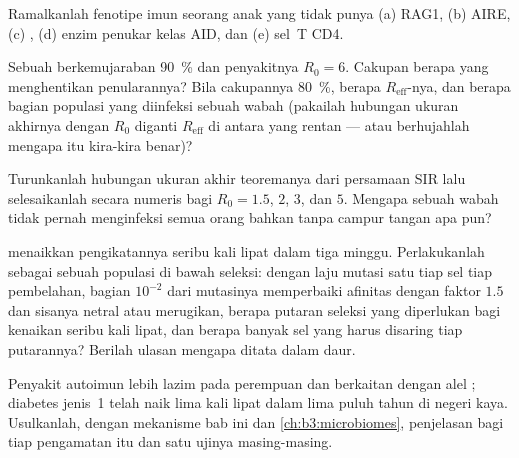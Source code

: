 \begin{exercise}[$\star\star$]\label{exo:b3:adaptive-immunity:8}
Ramalkanlah fenotipe imun seorang anak yang tidak punya (a) RAG1, (b) AIRE,
(c) , (d) enzim penukar kelas AID, dan (e) sel~T CD4.
\end{exercise}

\begin{exercise}[$\star\star$]\label{exo:b3:adaptive-immunity:9}
Sebuah  berkemujaraban \qty{90}{\%} dan penyakitnya $R_{0} = 6$. Cakupan
berapa yang menghentikan penularannya? Bila cakupannya \qty{80}{\%}, berapa
$R_{\text{eff}}$-nya, dan berapa bagian populasi yang diinfeksi sebuah wabah
(pakailah hubungan ukuran akhirnya dengan $R_{0}$ diganti
$R_{\text{eff}}$ di antara yang rentan --- atau berhujahlah mengapa itu
kira-kira benar)?
\end{exercise}

\begin{exercise}[$\star\star\star$]\label{exo:b3:adaptive-immunity:10}
Turunkanlah hubungan ukuran akhir teoremanya dari persamaan SIR
lalu selesaikanlah secara numeris bagi $R_{0} = 1.5$, $2$, $3$, dan $5$. Mengapa
sebuah wabah tidak pernah menginfeksi semua orang bahkan tanpa campur tangan apa pun?
\end{exercise}

\begin{exercise}[$\star\star\star$]\label{exo:b3:adaptive-immunity:11}
 menaikkan pengikatannya seribu kali lipat dalam tiga minggu.
Perlakukanlah  sebagai sebuah populasi di bawah seleksi: dengan
laju mutasi satu tiap sel tiap pembelahan, bagian $10^{-2}$ dari
mutasinya memperbaiki afinitas dengan faktor $1.5$ dan sisanya netral atau
merugikan, berapa putaran seleksi yang diperlukan bagi kenaikan seribu kali
lipat, dan berapa banyak sel yang harus disaring tiap putarannya? Berilah ulasan
mengapa  ditata dalam daur.
\end{exercise}

\begin{exercise}[$\star\star\star$]\label{exo:b3:adaptive-immunity:12}
Penyakit autoimun lebih lazim pada perempuan dan berkaitan dengan alel
; diabetes jenis~1 telah naik lima kali lipat dalam lima puluh tahun di
negeri kaya. Usulkanlah, dengan mekanisme bab ini dan
\cref{ch:b3:microbiomes}, penjelasan bagi tiap pengamatan itu dan satu
ujinya masing-masing.
\end{exercise}

